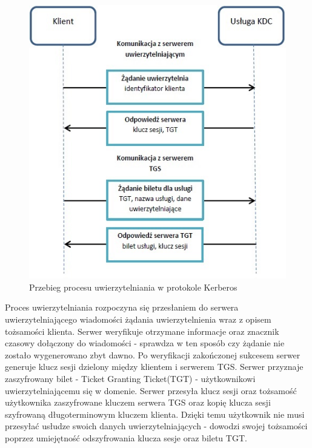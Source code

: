 			\begin{figure}[h]
				\centering
					\includegraphics{img/kerberos.jpg}
				\caption{Przebieg procesu uwierzytelniania w protokole Kerberos}
				\label{Przebieg procesu uwierzytelniania w protokole Kerberos}
			\end{figure}

			Proces uwierzytelniania rozpoczyna się przesłaniem  do serwera uwierzytelniającego wiadomości żądania uwierzytelnienia wraz z opisem tożsamości klienta\cite{Garman03}. Serwer weryfikuje otrzymane informacje oraz znacznik czasowy dołączony do wiadomości - sprawdza w ten sposób czy żądanie nie zostało wygenerowano zbyt dawno. Po weryfikacji zakończonej sukcesem serwer generuje klucz sesji dzielony między klientem i serwerem TGS. Serwer przyznaje zaszyfrowany bilet - Ticket Granting Ticket(TGT) - użytkownikowi uwierzytelniającemu się w domenie. Serwer przesyła klucz sesji oraz tożsamość użytkownika zaszyfrowane kluczem serwera TGS   oraz kopię klucza sesji szyfrowaną długoterminowym kluczem klienta. Dzięki temu użytkownik nie musi przesyłać usłudze swoich danych uwierzytelniających - dowodzi swojej tożsamości poprzez umiejętność odszyfrowania klucza sesje oraz biletu TGT. 

